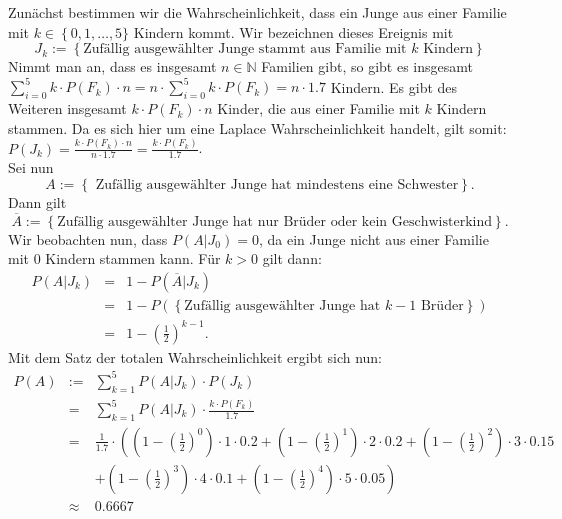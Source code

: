 \begin{Answer}
	Zunächst bestimmen wir die Wahrscheinlichkeit, dass ein Junge aus einer Familie mit $k\in\left\lbrace 0,1,\dots, 5\right.\rbrace$ Kindern kommt. Wir bezeichnen dieses Ereignis mit 
	\begin{equation*}
		J_k:=\left\lbrace \text{Zufällig ausgewählter Junge stammt aus Familie mit } k \text{ Kindern}\right\rbrace
	\end{equation*}
	Nimmt man an, dass es insgesamt $n\in\mathbb{N}$ Familien gibt, so gibt es insgesamt $\sum_{i=0}^5 k \cdot P(F_k)\cdot n=n\cdot\sum_{i=0}^5 k \cdot P(F_k)=n\cdot 1.7$ Kindern. Es gibt des Weiteren insgesamt $k\cdot P(F_k)\cdot n$ Kinder, die aus einer Familie mit $k$ Kindern stammen. Da es sich hier um eine Laplace Wahrscheinlichkeit handelt, gilt somit: $P(J_k)=\frac{k\cdot P(F_k)\cdot n}{n\cdot 1.7}=\frac{k\cdot P(F_k)}{1.7}$.\\
	Sei nun 
	\begin{equation*}
		A:=\left\lbrace\text{ Zufällig ausgewählter Junge hat mindestens eine Schwester}\right\rbrace.
	\end{equation*}
	Dann gilt
	\begin{equation*}
		\overline{A}:=\left\lbrace \text{Zufällig ausgewählter Junge hat nur Brüder oder kein Geschwisterkind}\right\rbrace.
	\end{equation*}
	Wir beobachten nun, dass $P(A\vert J_0)=0$, da ein Junge nicht aus einer Familie mit 0 Kindern stammen kann. Für $k>0$ gilt dann:
	\begin{eqnarray*}
		P(A\vert J_k)&=&1-P(\overline{A}\vert J_k)\\
		&=&1-P(\left\lbrace \text{Zufällig ausgewählter Junge hat } k-1 \text{ Brüder}\right\rbrace)\\
		&=& 1-\left(\frac{1}{2}\right)^{k-1}.
	\end{eqnarray*}
	Mit dem Satz der totalen Wahrscheinlichkeit ergibt sich nun:
	\begin{eqnarray*}
		P(A)&:=&\sum_{k=1}^5P(A\vert J_k)\cdot P(J_k)\\
		&=&\sum_{k=1}^5P(A\vert J_k)\cdot \frac{k\cdot P(F_k)}{1.7}\\
		&=&\frac{1}{1.7}\cdot \left(\left(1-\left(\frac{1}{2}\right)^0\right)\cdot 1 \cdot 0.2+\left(1-\left(\frac{1}{2}\right)^1\right)\cdot 2 \cdot 0.2+\left(1-\left(\frac{1}{2}\right)^2\right)\cdot 3 \cdot 0.15\right.\\
		&&\left. +\left(1-\left(\frac{1}{2}\right)^3\right)\cdot 4 \cdot 0.1+\left(1-\left(\frac{1}{2}\right)^4\right)\cdot 5 \cdot 0.05\right)\\
		&\approx&0.6667
	\end{eqnarray*}
\end{Answer}

